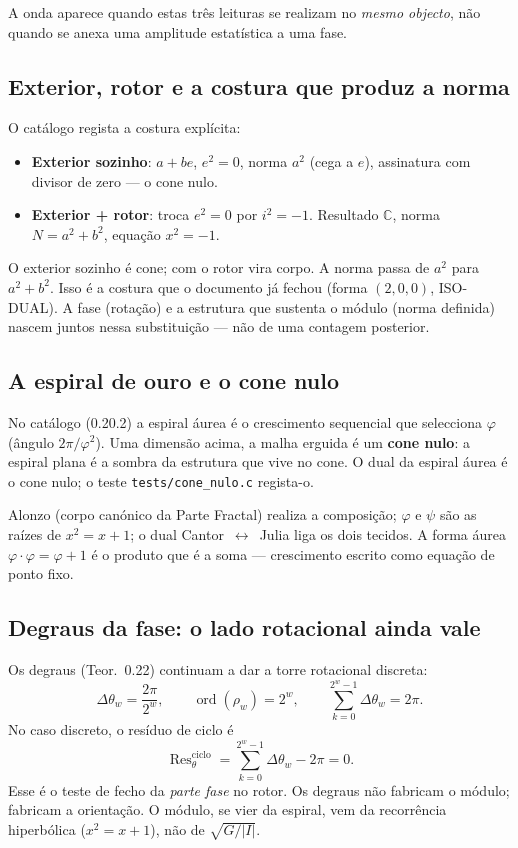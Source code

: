 \documentclass[11pt,a4paper]{article}
\begin{document}
A onda aparece quando estas três leituras se realizam no \emph{mesmo objecto},
não quando se anexa uma amplitude estatística a uma fase.

\subsection{Exterior, rotor e a costura que produz a norma}

O catálogo regista a costura explícita:

\begin{itemize}[leftmargin=1.3em,itemsep=2pt]
  \item \textbf{Exterior sozinho}: $a+be$, $e^2=0$, norma $a^2$ (cega a $e$),
        assinatura com divisor de zero --- o cone nulo.
  \item \textbf{Exterior + rotor}: troca $e^2=0$ por $i^2=-1$. Resultado $\mathbb{C}$,
        norma $N=a^2+b^2$, equação $x^2=-1$.
\end{itemize}

O exterior sozinho é cone; com o rotor vira corpo. A norma passa de $a^2$ para $a^2+b^2$.
Isso é a costura que o documento já fechou (forma $(2,0,0)$, ISO-DUAL).
A fase (rotação) e a estrutura que sustenta o módulo (norma definida) nascem juntos
nessa substituição --- não de uma contagem posterior.

\subsection{A espiral de ouro e o cone nulo}

No catálogo (0.20.2) a espiral áurea é o crescimento sequencial que selecciona $\varphi$
(ângulo $2\pi/\varphi^2$). Uma dimensão acima, a malha erguida é um \textbf{cone nulo}:
a espiral plana é a sombra da estrutura que vive no cone.
O dual da espiral áurea é o cone nulo; o teste \texttt{tests/cone\_nulo.c} regista-o.

Alonzo (corpo canónico da Parte Fractal) realiza a composição; $\varphi$ e $\psi$ são
as raízes de $x^2=x+1$; o dual Cantor~$\leftrightarrow$~Julia liga os dois tecidos.
A forma áurea $\varphi\cdot\varphi=\varphi+1$ é o produto que é a soma --- crescimento
escrito como equação de ponto fixo.

\subsection{Degraus da fase: o lado rotacional ainda vale}

Os degraus (Teor.~0.22) continuam a dar a torre rotacional discreta:
\[
\Delta\theta_w=\frac{2\pi}{2^w},\qquad
\operatorname{ord}(\rho_w)=2^w,\qquad
\sum_{k=0}^{2^w-1}\Delta\theta_w=2\pi.
\]
No caso discreto, o resíduo de ciclo é
\[
\operatorname{Res}^{\mathrm{ciclo}}_\theta
=\sum_{k=0}^{2^w-1}\Delta\theta_w-2\pi=0.
\]
Esse é o teste de fecho da \emph{parte fase} no rotor. Os degraus não fabricam o módulo;
 fabricam a orientação. O módulo, se vier da espiral, vem da recorrência hiperbólica
($x^2=x+1$), não de $\sqrt{G/|I|}$.
\end{document}
